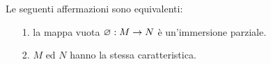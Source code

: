 \begin{corollary}
\label{corollariocaratteristica}
Le seguenti affermazioni sono equivalenti:
\begin{itemize}
\item[1.] la mappa vuota $\varnothing:M\rightarrow N$ \`e un'immersione parziale.
\item[2.] $M$ ed $N$ hanno la stessa caratteristica.\QED
\end{itemize}
\end{corollary}




\begin{comment}

\section{I tipi}\label{primoparagrafotipi}

Nel paragrafo~\ref{eqel} abbiamo introdotto il simbolo $\Th(M/A)$. Se $a$ \`e una enumerazione di $A$ allora $\Th(M/a)$ \`e un sinonimo per $\Th(M/A)$. Scriveremo \emph{$M,a\equiv N,c$\/} se per tutte le formule pure $\phi(x)$ 

\hspace*{25ex}\llap{$M\models \phi(a)$}\parbox{6ex}{\hfil$\IFF$}$N\models \phi(c)$.

Questo dice che $\Th(M/a)$ coincide con $\Th(N/c)$ quando ad $a$ si sostituisce $c$ coordinata per coordinata. Se al posto di formule pure consideriamo formule in $L(A)$ scriveremo \emph{$M,a\equiv_A N,c$}. 

Diremo \emph{tipo\/} per un insieme di formule. Generalmente indicheremo esplicitamente nella notazione le variabili che possono occorrere nelle formule che il tipo contiene: scriveremo \emph{$p(x)$}, \emph{$q(x)$}, ecc.\@ dove $x$ \`e una tupla di variabili.  Quindi la nozione di tipo generalizza quella di teoria: se $x$ \`e la tupla vuota, il tipo $p(x)$ \`e una teoria. Si noti che la tupla $x$ pu\`o essere infinita.

Scriveremo \emph{$M\models p(a)$} se $M\models\phi(a)$ per ogni formula in $p(x)$ e diremo che $a$ \`e una \emph{soluzione\/} o una \emph{realizzazione\/} di $p(x)$. Un'altra notazione spesso usata \`e \emph{$M,a\models p(x)$} o, quando $M$ \`e chiaro dal contesto, anche \emph{$a\models p(x)$}. Diremo che $p(x)$ \`e \emph{consistente\/} (o \emph{coerente}) \emph{in $M$\/} se ha soluzione in $M$ e in questo caso scriveremo \emph{$M\models\E x\,p(x)$}.  Diremo che $p(x)$ \`e \emph{consistente\/} tout court se \`e consistente in qualche modello. \`E sottinteso che, se si tratta di un tipo con parametri, il modello deve contenere i parametri. Definiamo


\end{comment}
